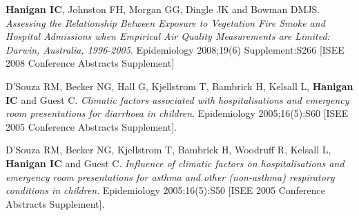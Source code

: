 \documentclass[a4paper,11pt]{article}
\begin{document}
%
{}
\medskip
\renewcommand{\labelenumi}{\textsc{d}\theenumi.}
\begin{revnumerate}

\item \textbf{Hanigan IC}, Johnston FH, Morgan GG, Dingle JK and Bowman DMJS.  \emph{Assessing the Relationship Between Exposure to Vegetation Fire Smoke and Hospital Admissions when Empirical Air Quality Measurements are Limited: Darwin, Australia, 1996-2005}.  Epidemiology 2008;19(6) Supplement:S266 [ISEE 2008 Conference Abstracts Supplement]

\item D'Souza RM, Becker NG, Hall G, Kjellstrom T, Bambrick H, Kelsall L, \textbf{Hanigan IC} and Guest C. \emph{Climatic factors associated with hospitalisations and emergency room presentations for diarrhoea in children}. Epidemiology 2005;16(5):S60 [ISEE 2005 Conference Abstracts Supplement].

\item D'Souza RM, Becker NG, Kjellstrom T, Bambrick H, Woodruff R, Kelsall L, \textbf{Hanigan IC} and Guest C. \emph{Influence of climatic factors on hospitalisations and emergency room presentations for asthma and other (non-asthma) respiratory conditions in children}. Epidemiology 2005;16(5):S50 [ISEE 2005 Conference Abstracts Supplement].

\end{revnumerate}
\end{document}

